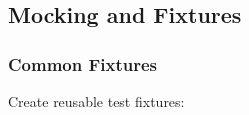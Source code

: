 \documentclass[letterpaper,10pt,english]{sphinxmanual}
\begin{document}
\subsection{Mocking and Fixtures}
\label{\detokenize{developer/testing:mocking-and-fixtures}}

\subsubsection{Common Fixtures}
\label{\detokenize{developer/testing:common-fixtures}}
\sphinxAtStartPar
Create reusable test fixtures:

\begin{sphinxVerbatim}[commandchars=\\\{\}]
 


\end{sphinxVerbatim}
\end{document}
